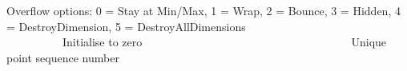 Overflow options\+: 0 = Stay at Min/\+Max, 1 = Wrap, 2 = Bounce, 3 = Hidden, 4 = Destroy\+Dimension, 5 = Destroy\+All\+Dimensions ~\newline
~\newline
~\newline
~\newline
~\newline
~\newline
~\newline
~\newline
~\newline
~\newline
~\newline
~\newline
~\newline
~\newline
~\newline
~\newline
~\newline
~\newline
~\newline
~\newline
~\newline
~\newline
~\newline
 Initialise to zero ~\newline
~\newline
~\newline
~\newline
~\newline
~\newline
~\newline
~\newline
~\newline
~\newline
~\newline
~\newline
~\newline
~\newline
~\newline
~\newline
~\newline
~\newline
~\newline
~\newline
~\newline
~\newline
 Unique point sequence number ~\newline
~\newline
~\newline
~\newline
